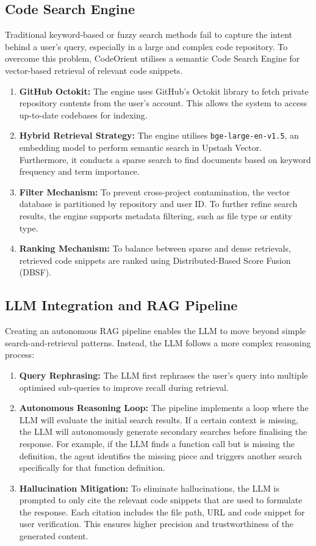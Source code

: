 \subsection{Code Search Engine}
Traditional keyword-based or fuzzy search methods fail to capture the intent behind a user's query, especially in a large and complex code repository. To overcome this problem, CodeOrient utilises a semantic Code Search Engine for vector-based retrieval of relevant code snippets.
\begin{enumerate}
    \item \textbf{GitHub Octokit:} The engine uses GitHub's Octokit library to fetch private repository contents from the user's account. This allows the system to access up-to-date codebases for indexing.
    \item \textbf{Hybrid Retrieval Strategy:} The engine utilises \texttt{bge-large-en-v1.5}, an embedding model to perform semantic search in Upstash Vector. Furthermore, it conducts a sparse search to find documents based on keyword frequency and term importance. 
    \item \textbf{Filter Mechanism:} To prevent cross-project contamination, the vector database is partitioned by repository and user ID. To further refine search results, the engine supports metadata filtering, such as file type or entity type.
    \item \textbf{Ranking Mechanism:} To balance between sparse and dense retrievals, retrieved code snippets are ranked using Distributed-Based Score Fusion (DBSF).
\end{enumerate}
\subsection{LLM Integration and RAG Pipeline}
Creating an autonomous RAG pipeline enables the LLM to move beyond simple search-and-retrieval patterns. Instead, the LLM follows a more complex reasoning process:
\begin{enumerate}
    \item \textbf{Query Rephrasing:} The LLM first rephrases the user's query into multiple optimised sub-queries to improve recall during retrieval.
    \item \textbf{Autonomous Reasoning Loop:} The pipeline implements a loop where the LLM will evaluate the initial search results. If a certain context is missing, the LLM will autonomously generate secondary searches before finalising the response. For example, if the LLM finds a function call but is missing the definition, the agent identifies the missing piece and triggers another search specifically for that function definition.
    \item \textbf{Hallucination Mitigation:} To eliminate hallucinations, the LLM is prompted to only cite the relevant code snippets that are used to formulate the response. Each citation includes the file path, URL and code snippet for user verification. This ensures higher precision and trustworthiness of the generated content.
\end{enumerate}

